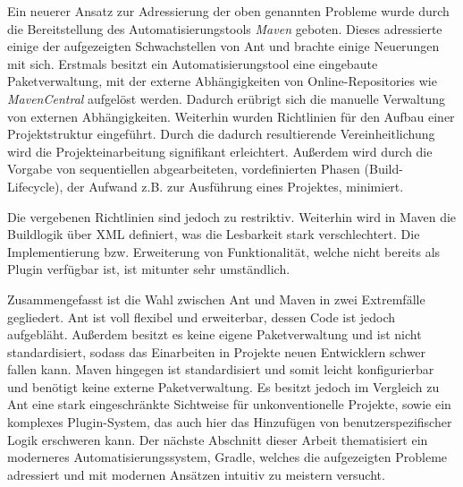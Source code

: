 Ein neuerer Ansatz zur Adressierung der oben genannten Probleme wurde durch die Bereitstellung des Automatisierungstools \textit{Maven} geboten.
Dieses adressierte einige der aufgezeigten Schwachstellen von Ant und brachte einige Neuerungen mit sich.
Erstmals besitzt ein Automatisierungstool eine eingebaute Paketverwaltung, mit der externe Abhängigkeiten von Online-Repositories wie \textit{MavenCentral} aufgelöst werden. 
Dadurch erübrigt sich die manuelle Verwaltung von externen Abhängigkeiten.
Weiterhin wurden Richtlinien für den Aufbau einer Projektstruktur eingeführt.
Durch die dadurch resultierende Vereinheitlichung wird die Projekteinarbeitung signifikant erleichtert.
Außerdem wird durch die Vorgabe von sequentiellen abgearbeiteten, vordefinierten Phasen (Build-Lifecycle), der Aufwand z.B. zur Ausführung eines Projektes, minimiert.

Die vergebenen Richtlinien sind jedoch zu restriktiv. Weiterhin wird in Maven die Buildlogik über XML definiert, was die Lesbarkeit stark verschlechtert.
Die Implementierung bzw. Erweiterung von Funktionalität, welche nicht bereits als Plugin verfügbar ist, ist mitunter sehr umständlich.

Zusammengefasst ist die Wahl zwischen Ant und Maven in zwei Extremfälle gegliedert.
Ant ist voll flexibel und erweiterbar, dessen Code ist jedoch aufgebläht. Außerdem besitzt es keine eigene Paketverwaltung und ist nicht standardisiert, sodass das Einarbeiten in Projekte neuen Entwicklern schwer fallen kann.
Maven hingegen ist standardisiert und somit leicht konfigurierbar und benötigt keine externe Paketverwaltung.
Es besitzt jedoch im Vergleich zu Ant eine stark eingeschränkte Sichtweise für unkonventionelle Projekte, sowie ein komplexes Plugin-System, das auch hier das Hinzufügen von benutzerspezifischer Logik erschweren kann. 
Der nächste Abschnitt dieser Arbeit thematisiert ein moderneres Automatisierungssystem, Gradle, welches die aufgezeigten Probleme adressiert und mit modernen Ansätzen intuitiv zu meistern versucht.

